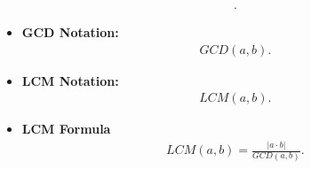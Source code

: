 \documentclass{report}
\begin{document}
\begin{itemize}
\begin{align*}
          .\end{align*}
        \item \textbf{GCD Notation:}
          \begin{align*}
            GCD(a,b)
          .\end{align*}
        \item \textbf{LCM Notation:}
          \begin{align*}
            LCM(a,b)
          .\end{align*}
        \item \textbf{LCM Formula}
          \begin{align*}
            LCM(a,b) = \frac{|a\cdot b|}{GCD(a,b)}
          .\end{align*}
      \end{itemize}

      \pagebreak \bigbreak \noindent 
\end{document}
